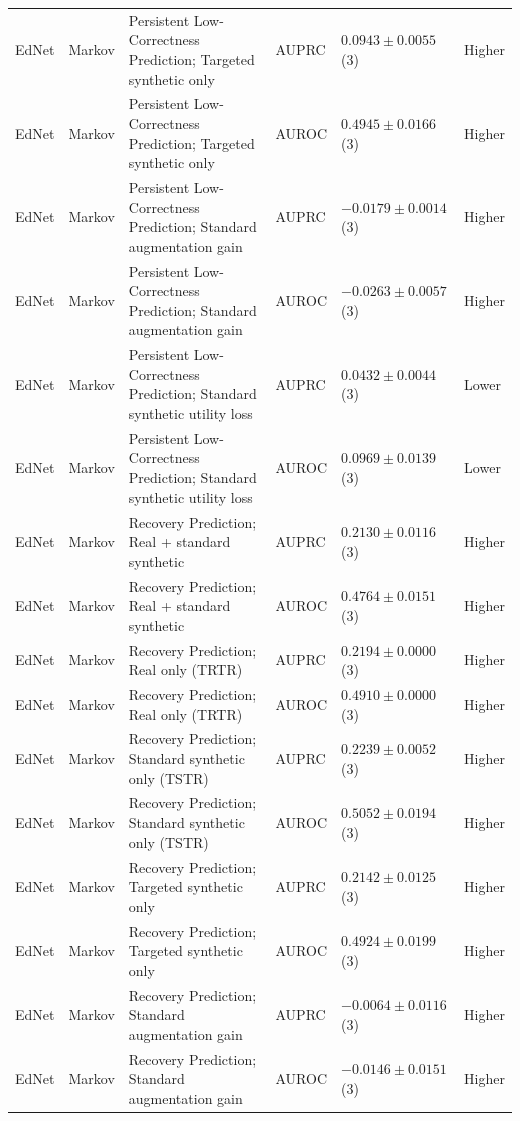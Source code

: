 \begin{longtable}{@{}p{2.25cm}p{2.05cm}p{4.7cm}p{5.0cm}p{2.6cm}p{1.25cm}@{}}
EdNet & Markov & Persistent Low-Correctness Prediction; Targeted synthetic only & AUPRC & $0.0943 \mathbin{\pm} 0.0055$ (3) & Higher \\
EdNet & Markov & Persistent Low-Correctness Prediction; Targeted synthetic only & AUROC & $0.4945 \mathbin{\pm} 0.0166$ (3) & Higher \\
EdNet & Markov & Persistent Low-Correctness Prediction; Standard augmentation gain & AUPRC & $-0.0179 \mathbin{\pm} 0.0014$ (3) & Higher \\
EdNet & Markov & Persistent Low-Correctness Prediction; Standard augmentation gain & AUROC & $-0.0263 \mathbin{\pm} 0.0057$ (3) & Higher \\
EdNet & Markov & Persistent Low-Correctness Prediction; Standard synthetic utility loss & AUPRC & $0.0432 \mathbin{\pm} 0.0044$ (3) & Lower \\
EdNet & Markov & Persistent Low-Correctness Prediction; Standard synthetic utility loss & AUROC & $0.0969 \mathbin{\pm} 0.0139$ (3) & Lower \\
EdNet & Markov & Recovery Prediction; Real + standard synthetic & AUPRC & $0.2130 \mathbin{\pm} 0.0116$ (3) & Higher \\
EdNet & Markov & Recovery Prediction; Real + standard synthetic & AUROC & $0.4764 \mathbin{\pm} 0.0151$ (3) & Higher \\
EdNet & Markov & Recovery Prediction; Real only (TRTR) & AUPRC & $0.2194 \mathbin{\pm} 0.0000$ (3) & Higher \\
EdNet & Markov & Recovery Prediction; Real only (TRTR) & AUROC & $0.4910 \mathbin{\pm} 0.0000$ (3) & Higher \\
EdNet & Markov & Recovery Prediction; Standard synthetic only (TSTR) & AUPRC & $0.2239 \mathbin{\pm} 0.0052$ (3) & Higher \\
EdNet & Markov & Recovery Prediction; Standard synthetic only (TSTR) & AUROC & $0.5052 \mathbin{\pm} 0.0194$ (3) & Higher \\
EdNet & Markov & Recovery Prediction; Targeted synthetic only & AUPRC & $0.2142 \mathbin{\pm} 0.0125$ (3) & Higher \\
EdNet & Markov & Recovery Prediction; Targeted synthetic only & AUROC & $0.4924 \mathbin{\pm} 0.0199$ (3) & Higher \\
EdNet & Markov & Recovery Prediction; Standard augmentation gain & AUPRC & $-0.0064 \mathbin{\pm} 0.0116$ (3) & Higher \\
EdNet & Markov & Recovery Prediction; Standard augmentation gain & AUROC & $-0.0146 \mathbin{\pm} 0.0151$ (3) & Higher \\

\end{longtable}
